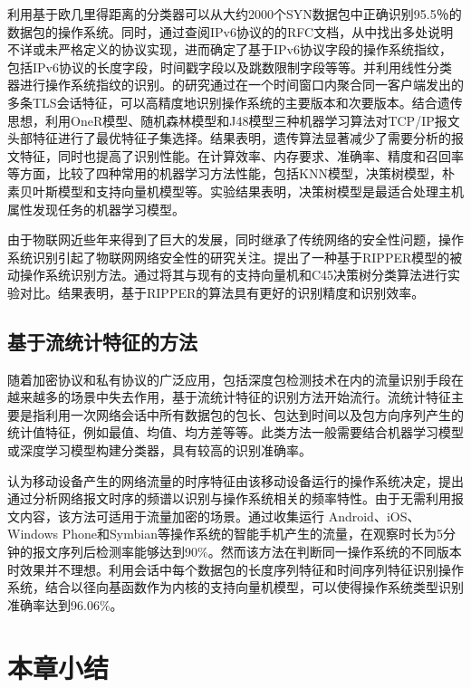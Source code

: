 \citet{tyagi2015packet}利用基于欧几里得距离的分类器可以从大约2000个SYN数据包中正确识别95.5％的数据包的操作系统。同时，\citet{fifield2015remote}通过查阅IPv6协议的的RFC文档，从中找出多处说明不详或未严格定义的协议实现，进而确定了基于IPv6协议字段的操作系统指纹，包括IPv6协议的长度字段，时间戳字段以及跳数限制字段等等。并利用线性分类器进行操作系统指纹的识别。\citet{anderson2017fingerprinting}的研究通过在一个时间窗口内聚合同一客户端发出的多条TLS会话特征，可以高精度地识别操作系统的主要版本和次要版本。\citet{aksoy2017operating}结合遗传思想，利用OneR模型、随机森林模型和J48模型三种机器学习算法对TCP/IP报文头部特征进行了最优特征子集选择。结果表明，遗传算法显著减少了需要分析的报文特征，同时也提高了识别性能。\citet{lavstovivcka2018machine}在计算效率、内存要求、准确率、精度和召回率等方面，比较了四种常用的机器学习方法性能，包括KNN模型，决策树模型，朴素贝叶斯模型和支持向量机模型等。实验结果表明，决策树模型是最适合处理主机属性发现任务的机器学习模型。

由于物联网近些年来得到了巨大的发展，同时继承了传统网络的安全性问题，操作系统识别引起了物联网网络安全性的研究关注。\citet{xuan2018identification}提出了一种基于RIPPER模型的被动操作系统识别方法。通过将其与现有的支持向量机和C45决策树分类算法进行实验对比。结果表明，基于RIPPER的算法具有更好的识别精度和识别效率。

\subsection{基于流统计特征的方法}

随着加密协议和私有协议的广泛应用，包括深度包检测技术在内的流量识别手段在越来越多的场景中失去作用，基于流统计特征的识别方法开始流行。流统计特征主要是指利用一次网络会话中所有数据包的包长、包达到时间以及包方向序列产生的统计值特征，例如最值、均值、均方差等等。此类方法一般需要结合机器学习模型或深度学习模型构建分类器，具有较高的识别准确率。

\citet{ruffing2016smartphone}认为移动设备产生的网络流量的时序特征由该移动设备运行的操作系统决定，提出通过分析网络报文时序的频谱以识别与操作系统相关的频率特性。由于无需利用报文内容，该方法可适用于流量加密的场景。通过收集运行 Android、iOS、Windows Phone和Symbian等操作系统的智能手机产生的流量，在观察时长为5分钟的报文序列后检测率能够达到90\%。然而该方法在判断同一操作系统的不同版本时效果并不理想。\citet{muehlstein2017analyzing}利用会话中每个数据包的长度序列特征和时间序列特征识别操作系统，结合以径向基函数作为内核的支持向量机模型，可以使得操作系统类型识别准确率达到96.06\%。

\section{本章小结}

